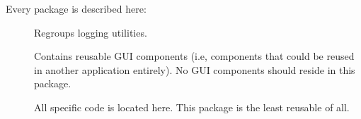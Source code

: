 \newcommand{\cxlogDescription}{Regroups logging utilities.}

\newcommand{\cxguiDescription}{Contains reusable GUI components (i.e, components
that could be reused in another application entirely). No \connectx GUI
components should reside in this package.}

\newcommand{\cxexecDescription}{All \connectx specific code is located here.
This package is the least reusable of all.}


Every \connectx package is described here:

\begin{description}
    \item[\cxinv]   \cxinvDescription
    \item[\cxmath]  \cxmathDescription
    \item[\cxutil]  \cxutilDescription
    \item[\cxcmd]   \cxcmdDescription
    \item[\cxbase]  \cxbaseDescription
    \item[\cxos]    \cxosDescription
    \item[\cxlog]   \cxlogDescription
    \item[\cxgui]   \cxguiDescription
    \item[\cxexec]  \cxexecDescription
\end{description}
